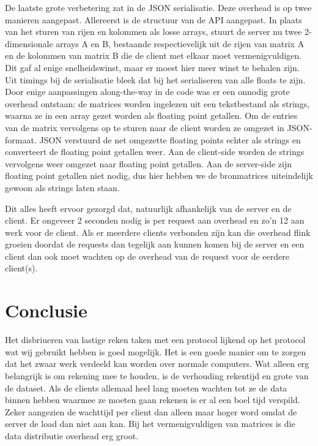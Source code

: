 \documentclass[11pt]{article}
\begin{document}
De laatste grote verbetering zat in de JSON serialisatie. Deze overhead is op twee manieren
aangepast. Allereerst is de structuur van de API aangepast. In plaats van het sturen van rijen
en kolommen als losse arrays, stuurt de server nu twee 2-dimensionale arrays A en B,
bestaande respectievelijk uit de rijen van matrix A en de kolommen van matrix B die de client
met elkaar moet vermenigvuldigen. Dit gaf al enige snelheidswinst, maar er moest hier meer winst
te behalen zijn. Uit timings bij de serialisatie bleek dat bij het serialiseren van alle floats
te zijn. Door enige aanpassingen along-the-way in de code was er een onnodig grote overhead
ontstaan: de matrices worden ingelezen uit een tekstbestand als strings, waarna ze in een array
gezet worden als floating point getallen. Om de entries van de matrix vervolgens op te sturen
naar de client worden ze omgezet in JSON-formaat. JSON verstuurd de net omgezette floating points
echter als strings en converteert de floating point getallen weer. Aan de client-side worden de
strings vervolgens weer omgezet naar floating point getallen. Aan de server-side zijn floating
point getallen niet nodig, dus hier hebben we de bronmatrices uiteindelijk gewoon als strings
laten staan.

Dit alles heeft ervoor gezorgd dat, natuurlijk afhankelijk van de server en de
client. Er ongeveer 2 seconden nodig is per request aan overhead en zo'n 12 aan
werk voor de client. Als er meerdere clients verbonden zijn kan die overhead
flink groeien doordat de requests dan tegelijk aan kunnen komen bij de server en
een client dan ook moet wachten op de overhead van de request voor de eerdere
client(s).


\section{Conclusie}
Het disbriueren van lastige reken taken met een protocol lijkend op het protocol
wat wij gebruikt hebben is goed mogelijk. Het is een goede manier om te zorgen
dat het zwaar werk verdeeld kan worden over normale computers. Wat alleen erg
belangrijk is om rekening mee te houden, is de verhouding rekentijd en grote van
de dataset. Als de clients allemaal heel lang moeten wachten tot ze de data
binnen hebben waarmee ze moeten gaan rekenen is er al een boel tijd verspild.
Zeker aangezien de wachttijd per client dan alleen maar hoger word omdat de
server de load dan niet aan kan. Bij het vermenigvuldigen van matrices is die
data distributie overhead erg groot.
\end{document}
